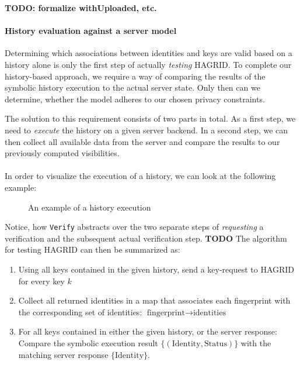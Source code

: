 \textbf{TODO: formalize withUploaded, etc. }

\paragraph{History evaluation against a server model}
Determining which associations between identities and keys are valid based on a history alone is only the first step of actually \emph{testing} HAGRID. To complete our history-based approach, we require a way of comparing the results of the symbolic history execution to the actual server state. Only then can we determine, whether the model adheres to our chosen privacy constraints.



The solution to this requirement consists of two parts in total. As a first step, we need to \emph{execute} the history on a given server backend. In a second step, we can then collect all available data from the server and compare the results to our previously computed visibilities. 
\\ \\
In order to visualize the execution of a history, we can look at the following example: 
\begin{figure}[h]
    \label{fig:history}
    \centering
    \caption{An example of a history execution}
\end{figure}


Notice, how \texttt{Verify} abstracts over the two separate steps of \emph{requesting} a verification and the subsequent actual verification step.
\textbf{TODO}
The algorithm for testing HAGRID can then be summarized as: 
\begin{enumerate}
    \item Using all keys contained in the given history, send a key-request to HAGRID for every key $k$
    \item Collect all returned identities in a map that associates each fingerprint with the corresponding set of identities: $ \text{fingerprint} \rightarrow \text{identities}$
    \item\label{sec:comp_hagrid} For all keys contained in either the given history, or the server response: Compare the symbolic execution result $\{(\text{Identity},\text{Status})\}$ with the matching server response $\{\text{Identity}\}$.
\end{enumerate}

